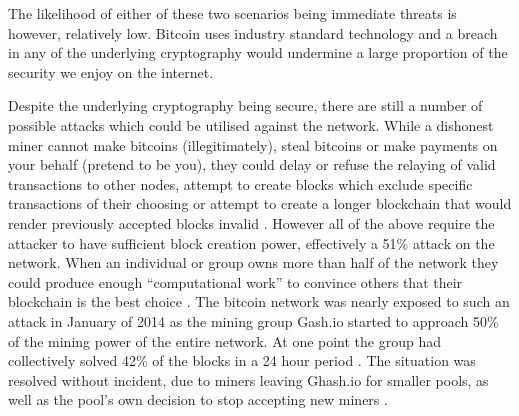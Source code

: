 \documentclass{article}
\begin{document}
The likelihood of either of these two scenarios being immediate threats is however, relatively low. Bitcoin uses industry standard technology and a breach in any of the underlying cryptography would undermine a large proportion of the security we enjoy on the internet. 

Despite the underlying cryptography being secure, there are still a number of possible attacks which could be utilised against the network. While a dishonest miner cannot make bitcoins (illegitimately), steal bitcoins or make payments on your behalf (pretend to be you), they could delay or refuse the relaying of valid transactions to other nodes, attempt to create blocks which exclude specific transactions of their choosing or attempt to create a longer blockchain that would render previously accepted blocks invalid \citep{22_brave_new_coin_2016}. However all of the above require the attacker to have sufficient block creation power, effectively a 51\% attack on the network. When an individual or group owns more than half of the network they could produce enough ``computational work'' to convince others that their blockchain is the best choice \citep{41_yang_2011}. The bitcoin network was nearly exposed to such an attack in January of 2014 as the mining group Gash.io started to approach 50\% of the mining power of the entire network. At one point the group had collectively solved 42\% of the blocks in a 24 hour period \citep{42_liu_2014}. The situation was resolved without incident, due to miners leaving Ghash.io for smaller pools, as well as the pool’s own decision to stop accepting new miners \citep{41_yang_2011}.
    
\printbibliography
\end{document}
